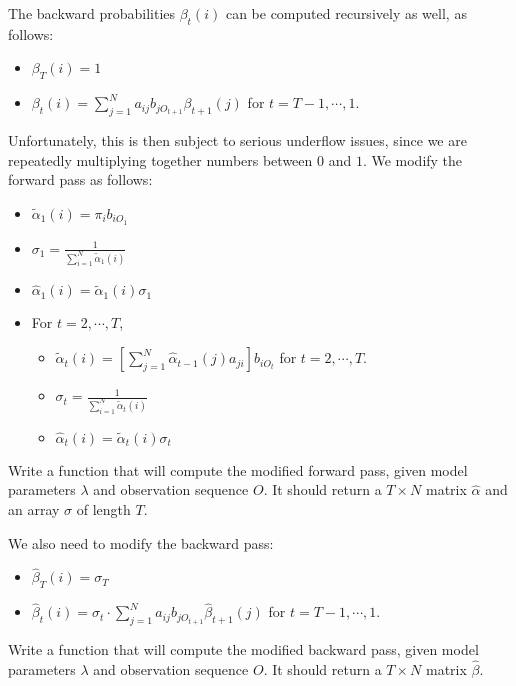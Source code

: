 The backward probabilities $\beta_{t}(i)$ can be computed recursively as well, as follows:
\begin{itemize}
 \item $\beta_{T}(i) = 1$
 \item $\beta_{t}(i) = \sum_{j=1}^{N} a_{ij}b_{jO_{t+1}}\beta_{t+1}(j)$ for $t = T-1, \cdots, 1$.
\end{itemize}

Unfortunately, this is then subject to serious underflow issues, since we are repeatedly multiplying together numbers between $0$ and $1$. We modify the forward pass as follows:

\begin{itemize}
 \item $\tilde{\alpha}_{1}(i) = \pi_{i} b_{iO_{1}}$
 \item $\sigma_{1} = \frac{1}{\sum_{i=1}^{N} \tilde{\alpha}_{1}(i)}$
 \item $\widehat{\alpha}_{1}(i) = \tilde{\alpha}_{1}(i) \sigma_{1}$
 \item For $t = 2, \cdots, T$,
 \begin{itemize}
	 \item $\tilde{\alpha}_{t}(i) = \left[ \sum_{j=1}^{N} \widehat{\alpha}_{t-1}(j)a_{ji}\right] b_{iO_{t}}$ for $t = 2,\cdots,T.$
	 \item $\sigma_{t} = \frac{1}{\sum_{i=1}^{N} \tilde{\alpha}_{t}(i)}$
	 \item $\widehat{\alpha}_{t}(i) = \tilde{\alpha}_{t}(i) \sigma_{t}$
 \end{itemize}
\end{itemize}

\begin{problem}
Write a function that will compute the modified forward pass, given model parameters $\lambda$ and observation sequence $O$. It should return a $T \times N$ matrix $\widehat{\alpha}$ and an array $\sigma$ of length $T$.
\end{problem}

We also need to modify the backward pass:

\begin{itemize}
 \item $\widehat{\beta}_{T}(i) = \sigma_{T}$
 \item $\widehat{\beta}_{t}(i) = \sigma_{t} \cdot \sum_{j=1}^{N} a_{ij}b_{jO_{t+1}}\widehat{\beta}_{t+1}(j)$ for $t = T-1, \cdots, 1$.
\end{itemize}

\begin{problem}
Write a function that will compute the modified backward pass, given model parameters $\lambda$ and observation sequence $O$. It should return a $T \times N$ matrix $\widehat{\beta}$.
\end{problem}

